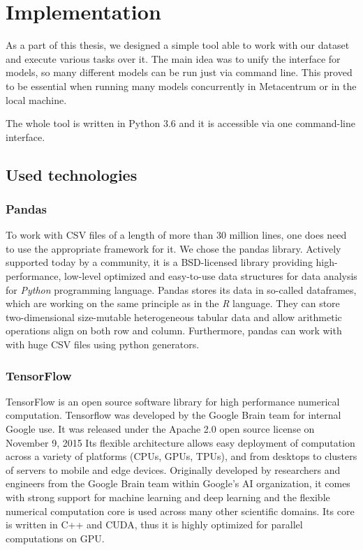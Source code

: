 \chapter{Implementation}

As a part of this thesis, we designed a simple tool able to work with our dataset and execute various tasks over it. The main idea was to unify the interface for models, so many different models can be run just via command line. This proved to be essential when running many models concurrently in Metacentrum or in the local machine. 

The whole tool is written in Python 3.6 and it is accessible via one command-line interface.

\section{Used technologies}

\subsection{Pandas}

To work with CSV files of a length of more than 30 million lines, one does need to use the appropriate framework for it. We chose the pandas\cite{pandas} library. Actively supported today by a community, it is a BSD-licensed library providing high-performance, low-level optimized and easy-to-use data structures for data analysis for \textit{Python} programming language. Pandas stores its data in so-called dataframes\cite{pandas-df}, which are working on the same principle as in the \textit{R} language. They can store two-dimensional size-mutable heterogeneous tabular data and allow arithmetic operations align on both row and column. Furthermore, pandas can work with with huge CSV files using python generators.

\subsection{TensorFlow}

TensorFlow\cite{tensorflow} is an open source software library for high performance numerical computation. Tensorflow was developed by the Google Brain team for internal Google use. It was released under the Apache 2.0 open source license on November 9, 2015 Its flexible architecture allows easy deployment of computation across a variety of platforms (CPUs, GPUs, TPUs), and from desktops to clusters of servers to mobile and edge devices. Originally developed by researchers and engineers from the Google Brain team within Google’s AI organization, it comes with strong support for machine learning and deep learning and the flexible numerical computation core is used across many other scientific domains. Its core is written in C++ and CUDA, thus it is highly optimized for parallel computations on GPU.

